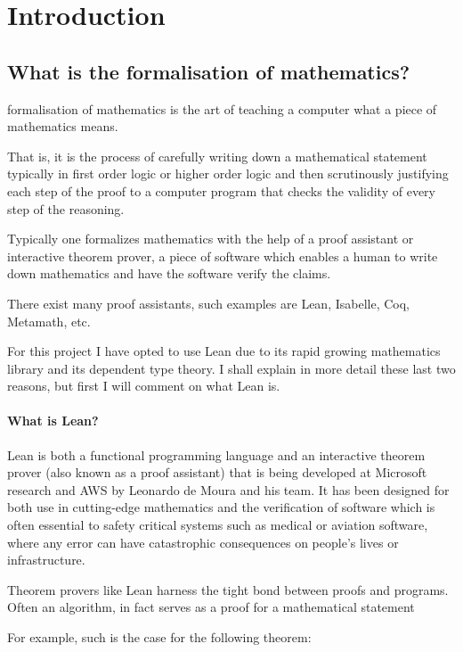 \chapter{Introduction}\label{Ch2_Introduction}

\section{What is the formalisation of mathematics?}

formalisation of mathematics is the art of teaching a computer what a piece of mathematics means.

That is, it is the process of carefully writing down a mathematical statement typically in first order logic or higher order logic and then scrutinously justifying each step of the proof to a computer program that checks the validity of every step of the reasoning. 

Typically one formalizes mathematics with the help of a proof assistant or interactive theorem prover, a piece of software which enables a human to write down mathematics and have the software verify the claims.

There exist many proof assistants, such examples are Lean, Isabelle, Coq, Metamath, etc.

For this project I have opted to use Lean due to its rapid growing mathematics library and its dependent type theory. I shall explain in more detail these last two reasons, but first I will comment on what Lean is.

\subsubsection{What is Lean?}

Lean is both a functional programming language and an interactive theorem prover (also known as a proof assistant) that is being developed at Microsoft research and AWS by Leonardo de Moura and his team.
It has been designed for both use in cutting-edge mathematics and the verification of software which is often essential to safety critical systems such as medical or aviation software, where any error can have
catastrophic consequences on people's lives or infrastructure.

Theorem provers like Lean harness the tight bond between proofs and programs. Often an algorithm, in fact serves as a proof for a mathematical statement

For example, such is the case for the following theorem:

